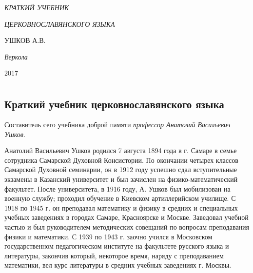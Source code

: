 \documentclass[11pt,a4paper,oneside]{memoir}
\newcommand*{\labelit}[1]{\phantomsection\label{#1}}
\newlength{\tpheight}\setlength{\tpheight}{0.9\textheight}
\newlength{\txtheight}\setlength{\txtheight}{0.9\tpheight}
\newlength{\tpwidth}\setlength{\tpwidth}{0.9\textwidth}
\newlength{\txtwidth}\setlength{\txtwidth}{0.9\tpwidth}
\newlength{\drop}
\newenvironment{showtitle}{%
        \begin{boxminipage}[c][\tpheight]{\tpwidth}
          \centering
          \begin{vplace}
          \begin{minipage}[c][\txtheight]{\txtwidth}}%
            {
            \end{minipage}
          \end{vplace}
      \end{boxminipage}}
\newcommand*{\titleCC}{\begingroup%
        \drop=0.1\txtheight
        \vspace*{\drop}
        \centering
        {\Large\itshape КРАТКИЙ УЧЕБНИК}\\[0.5\drop]
        {\textcolor{Red}{\HUGE\bfseries {\slv{✠}}}}\par
        \vspace{\drop}
        {\LARGE\itshape ЦЕРКОВНОСЛАВЯНСКОГО ЯЗЫКА}\par
        \vfill
        {\Large УШКОВ А.В.}\par
        \vfill
        {\itshape Веркола}\par
        {\scshape 2017}\par
        \vspace*{\drop}
      \endgroup}
\begin{document}
        \begin{titlingpage}
          \begin{showtitle}
            \titleCC
          \end{showtitle}
          \labelit{CC}
          {
            \par\vspace{0.2\baselineskip}
          }
        \end{titlingpage}

        \tableofcontents*

        \chapter*{}
        \section*{Краткий учебник церковнославянского языка}
        \label{sec:brief}

        Составитель сего учебника доброй памяти \emph{профессор
        Анатолий Васильевич Ушков}.

        Анатолий Васильевич Ушков родился 7 августа 1894 года в г.
        Самаре в семье сотрудника Самарской Духовной Консистории. По
        окончании четырех классов Самарской Духовной семинарии, он в
        1912 году успешно сдал вступительные экзамены в Казанский
        университет и был зачислен на физико-математический
        факультет. После университета, в 1916 году, А. Ушков был
        мобилизован на военную службу; проходил обучение в Киевском
        артиллерийском училище. С 1918 по 1945 г. он преподавал
        математику и физику в средних и специальных учебных
        заведениях в городах Самаре, Красноярске и Москве. Заведовал
        учебной частью и был руководителем методических совещаний по
        вопросам преподавания физики и математики. С 1939 по 1943 г.
        заочно учился в Московском государственном педагогическом
        институте на факультете русского языка и литературы, закончив
        который, некоторое время, наряду с преподаванием математики,
        вел курс литературы в средних учебных заведениях г. Москвы.
\end{document}
